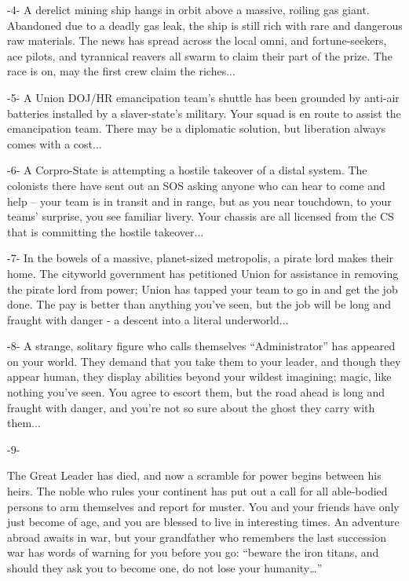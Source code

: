                                                      -4-  
A derelict mining ship hangs in orbit above a massive, roiling gas giant. Abandoned due to a  
deadly gas leak, the ship is still rich with rare and dangerous raw materials. The news has spread  
across the local omni, and fortune-seekers, ace pilots, and tyrannical reavers all swarm to claim  
their part of the prize. The race is on, may the first crew claim the riches...  

                                                     -5-  
A Union DOJ/HR emancipation team’s shuttle has been grounded by anti-air batteries installed by  
a slaver-state’s military. Your squad is en route to assist the emancipation team. There may be a  
diplomatic solution, but liberation always comes with a cost...  

                                                     -6-  
A Corpro-State is attempting a hostile takeover of a distal system. The colonists there have sent  
out an SOS asking anyone who can hear to come and help -- your team is in transit and in range,  
but as you near touchdown, to your teams’ surprise, you see familiar livery. Your chassis are all  
licensed from the CS that is committing the hostile takeover...  

                                                     -7-  
In the bowels of a massive, planet-sized metropolis, a pirate lord makes their home. The cityworld  
government has petitioned Union for assistance in removing the pirate lord from power; Union  
has tapped your team to go in and get the job done. The pay is better than anything you’ve seen,  
but the job will be long and fraught with danger - a descent into a literal underworld...  

                                                     -8-  
A strange, solitary figure who calls themselves “Administrator” has appeared on your world. They  
demand that you take them to your leader, and though they appear human, they display abilities  
beyond your wildest imagining; magic, like nothing you’ve seen. You agree to escort them, but  
the road ahead is long and fraught with danger, and you’re not so sure about the ghost they carry  
with them...    

                                                     -9-  

                                                                                                          


The Great Leader has died, and now a scramble for power begins between his heirs. The noble  
who rules your continent has put out a call for all able-bodied persons to arm themselves and  
report for muster. You and your friends have only just become of age, and you are blessed to live  
in interesting times. An adventure abroad awaits in war, but your grandfather who remembers the  
last succession war has words of warning for you before you go: “beware the iron titans, and  
should they ask you to become one, do not lose your humanity…”   

